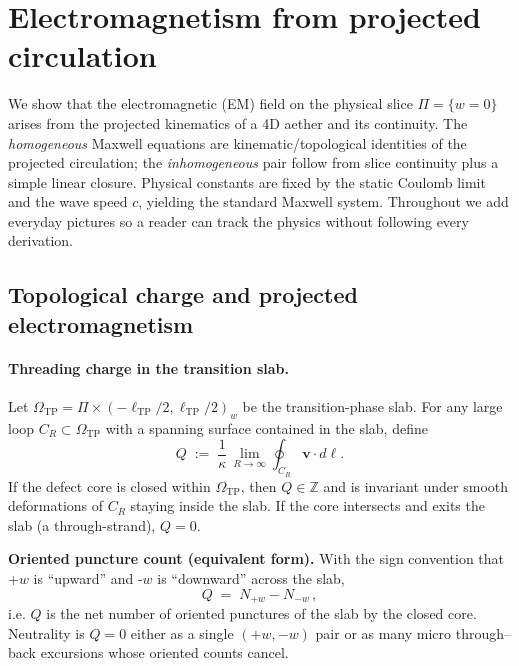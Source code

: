 \section{Electromagnetism from projected circulation}
\label{sec:EM_projection}

We show that the electromagnetic (EM) field on the physical slice $\Pi=\{w=0\}$ arises from the projected kinematics of a 4D aether and its continuity. The \emph{homogeneous} Maxwell equations are kinematic/topological identities of the projected circulation; the \emph{inhomogeneous} pair follow from slice continuity plus a simple linear closure. Physical constants are fixed by the static Coulomb limit and the wave speed $c$, yielding the standard Maxwell system. Throughout we add everyday pictures so a reader can track the physics without following every derivation.

\subsection{Topological charge and projected electromagnetism}
\label{sec:projected-em:charge}

\paragraph{Threading charge in the transition slab.}
Let $\Omega_{\mathrm{TP}}=\Pi\times(-\ell_{\mathrm{TP}}/2,\ell_{\mathrm{TP}}/2)_w$ be the transition-phase slab.
For any large loop $C_R\subset\Omega_{\mathrm{TP}}$ with a spanning surface contained in the slab, define
\begin{equation}
\label{eq:Q-threading}
Q \;:=\; \frac{1}{\kappa}\,\lim_{R\to\infty}\oint_{C_R}\mathbf v\cdot d\boldsymbol\ell.
\end{equation}
If the defect core is closed within $\Omega_{\mathrm{TP}}$, then $Q\in\mathbb Z$ and is invariant under smooth deformations of $C_R$ staying inside the slab. If the core intersects and exits the slab (a through-strand), $Q=0$.

\noindent\textbf{Oriented puncture count (equivalent form).}
With the sign convention that +$w$ is ``upward'' and -$w$ is ``downward'' across the slab,
\begin{equation}
Q \;=\; N_{+w}-N_{-w}\,,
\label{eq:Q-oriented-count}
\end{equation}
i.e. $Q$ is the net number of oriented punctures of the slab by the closed core. Neutrality is $Q{=}0$ either as a single $(+w,-w)$ pair or as many micro through--back excursions whose oriented counts cancel.

